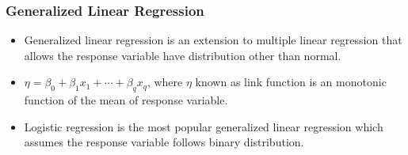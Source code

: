 \documentclass[11pt]{beamer}
\begin{document}
\begin{frame}
\frametitle{Generalized Linear Regression}
\begin{itemize}
    \item Generalized linear regression is an extension to multiple linear regression that allows the response variable have distribution other than normal.  
    \item $\eta=\beta_0+\beta_1x_1+\cdots+\beta_qx_q$, where $\eta$ known as link function is an monotonic function of the mean of response variable.
    \item Logistic regression is the most popular generalized linear regression which assumes the response variable follows binary distribution.
\end{itemize}
\end{frame}
\end{document}
